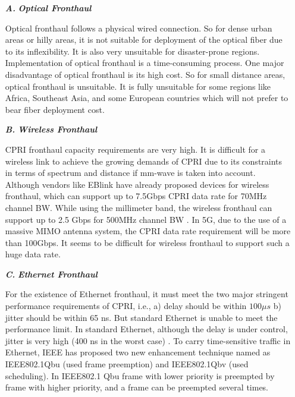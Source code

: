 \begin{multicols}{2}
\begin{itemize}
\item[{\textit{\textbf{ A.}}}] {\textit{\textbf{Optical Fronthaul}}}

Optical fronthaul follows a physical wired connection. So for dense urban areas or hilly areas, it is not suitable for deployment of the optical fiber due to its inflexibility. It is also very unsuitable for disaster-prone regions. Implementation of optical fronthaul is a time-consuming process. One major disadvantage of optical fronthaul is its high cost. So for small distance areas, optical fronthaul is unsuitable. It is fully unsuitable for some regions like Africa, Southeast Asia, and some European countries which will not prefer to bear fiber deployment cost.

\item[{\textit{\textbf{ B.}}}] {\textit{\textbf{Wireless Fronthaul}}}

CPRI fronthaul capacity requirements are very high. It is difficult for a wireless link to achieve the growing demands of CPRI due to its constraints in terms of spectrum and distance if mm-wave is taken into account. Although vendors like EBlink have already proposed devices for wireless fronthaul, which can support up to 7.5Gbps CPRI data rate for 70MHz channel BW. While using the millimeter band, the wireless fronthaul can support up to 2.5 Gbps for 500MHz channel BW \cite{art3-key43}. In 5G, due to the use of a massive MIMO antenna system, the CPRI data rate requirement will be more than 100Gbps. It seems to be difficult for wireless fronthaul to support such a huge data rate.

\item[{\textit{\textbf{ C.}}}] {\textit{\textbf{Ethernet Fronthaul}}}

For the existence of Ethernet fronthaul, it must meet the two major stringent performance requirements of CPRI, i.e., a) delay should be within $100 \mu s$ b) jitter should be within 65 ns. But standard Ethernet is unable to meet the performance limit. In standard Ethernet, although the delay is under control, jitter is very high (400 ns in the worst case) \cite{art3-key49}. To carry time-sensitive traffic in Ethernet, IEEE has proposed two new enhancement technique named as IEEE802.1Qbu (used frame preemption) and IEEE802.1Qbv (used scheduling). In IEEE802.1 Qbu frame with lower priority is preempted by frame with higher priority, and a frame can be preempted several times.



\end{itemize}
\end{multicols}
